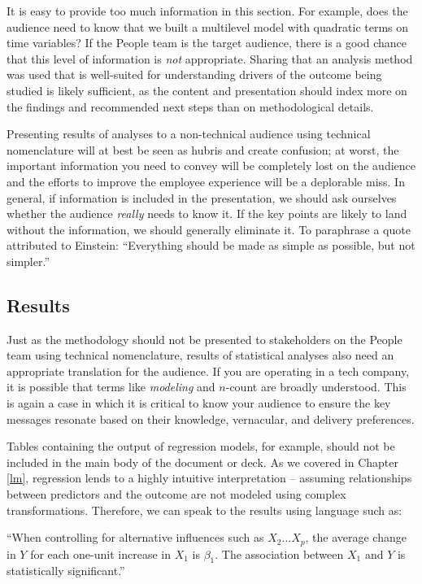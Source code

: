\documentclass[
]{book}
\begin{document}
It is easy to provide too much information in this section. For example, does the audience need to know that we built a multilevel model with quadratic terms on time variables? If the People team is the target audience, there is a good chance that this level of information is \emph{not} appropriate. Sharing that an analysis method was used that is well-suited for understanding drivers of the outcome being studied is likely sufficient, as the content and presentation should index more on the findings and recommended next steps than on methodological details.

Presenting results of analyses to a non-technical audience using technical nomenclature will at best be seen as hubris and create confusion; at worst, the important information you need to convey will be completely lost on the audience and the efforts to improve the employee experience will be a deplorable miss. In general, if information is included in the presentation, we should ask ourselves whether the audience \emph{really} needs to know it. If the key points are likely to land without the information, we should generally eliminate it. To paraphrase a quote attributed to Einstein: ``Everything should be made as simple as possible, but not simpler.''

\hypertarget{results}{%
\subsection{Results}\label{results}}

Just as the methodology should not be presented to stakeholders on the People team using technical nomenclature, results of statistical analyses also need an appropriate translation for the audience. If you are operating in a tech company, it is possible that terms like \emph{modeling} and \(n\)-count are broadly understood. This is again a case in which it is critical to know your audience to ensure the key messages resonate based on their knowledge, vernacular, and delivery preferences.

Tables containing the output of regression models, for example, should not be included in the main body of the document or deck. As we covered in Chapter \ref{lm}, regression lends to a highly intuitive interpretation -- assuming relationships between predictors and the outcome are not modeled using complex transformations. Therefore, we can speak to the results using language such as:

``When controlling for alternative influences such as \(X_2 ... X_p\), the average change in \(Y\) for each one-unit increase in \(X_1\) is \(\beta_1\). The association between \(X_1\) and \(Y\) is statistically significant.''
\end{document}
